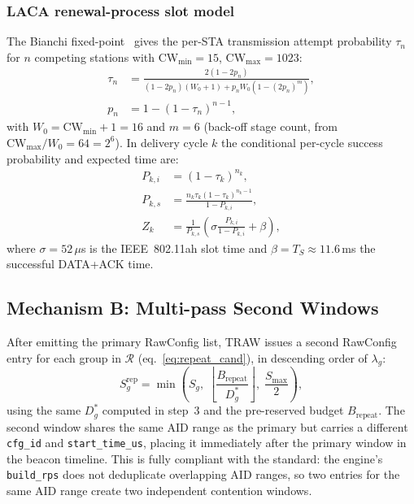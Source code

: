 \documentclass[conference]{IEEEtran}
\begin{document}
\subsubsection{LACA renewal-process slot model}
\label{sec:laca_detail}
The Bianchi fixed-point~\cite{bianchi2000} gives the per-STA
transmission attempt probability $\tau_n$ for $n$ competing stations
with CW$_\mathrm{min}\!=\!15$, CW$_\mathrm{max}\!=\!1023$:
\begin{align}
  \tau_n &= \frac{2(1-2p_n)}{(1-2p_n)(W_0+1)+p_nW_0(1-(2p_n)^m)}, \\
  p_n    &= 1-(1-\tau_n)^{n-1},
\end{align}
with $W_0\!=\!\mathrm{CW}_\mathrm{min}\!+\!1\!=\!16$ and $m\!=\!6$
(back-off stage count, from $\mathrm{CW}_\mathrm{max}/W_0\!=\!64\!=\!2^6$).
In delivery cycle $k$ the conditional per-cycle success probability and
expected time are:
\begin{align}
  P_{k,i} &= (1-\tau_k)^{n_k}, \\
  P_{k,s} &= \frac{n_k\tau_k(1-\tau_k)^{n_k-1}}{1-P_{k,i}}, \\
  Z_k     &= \frac{1}{P_{k,s}}\!\left(\sigma\frac{P_{k,i}}{1-P_{k,i}}+\beta\right),
  \label{eq:zk}
\end{align}
where $\sigma\!=\!52\,\mu$s is the IEEE~802.11ah slot time and
$\beta\!=\!T_S\!\approx\!11.6$\,ms the successful DATA+ACK time.

\subsection{Mechanism B: Multi-pass Second Windows}
\label{sec:multipass}

After emitting the primary RawConfig list, TRAW issues a second
RawConfig entry for each group in $\mathcal{R}$ (eq.~\eqref{eq:repeat_cand}),
in descending order of $\lambda_g$:
\begin{equation}
  S_g^\mathrm{rep} = \min\!\left(S_g,\;\left\lfloor\frac{B_\mathrm{repeat}}{D_g^*}
    \right\rfloor,\;\frac{S_\mathrm{max}}{2}\right),
  \label{eq:rep_slots}
\end{equation}
using the same $D_g^*$ computed in step~3 and the pre-reserved budget
$B_\mathrm{repeat}$.
The second window shares the same AID range as the primary but carries
a different \texttt{cfg\_id} and \texttt{start\_time\_us}, placing it
immediately after the primary window in the beacon timeline.
This is fully compliant with the standard: the engine's \texttt{build\_rps}
does not deduplicate overlapping AID ranges, so two entries for the same
AID range create two independent contention windows.
\end{document}

